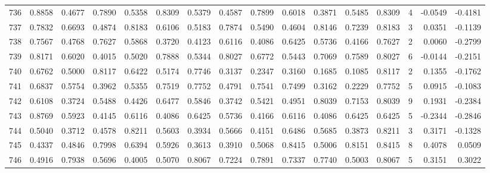 \begin{tabular}{lrrrrrrrrrrrrrrr}
736 &      0.8858 &  0.4677 &  0.7890 &  0.5358 &  0.8309 &  0.5379 &  0.4587 &  0.7899 &  0.6018 &  0.3871 &   0.5485 &     0.8309 &      4 &                   -0.0549 &                    -0.4181 \\
737 &      0.7832 &  0.6693 &  0.4874 &  0.8183 &  0.6106 &  0.5183 &  0.7874 &  0.5490 &  0.4604 &  0.8146 &   0.7239 &     0.8183 &      3 &                    0.0351 &                    -0.1139 \\
738 &      0.7567 &  0.4768 &  0.7627 &  0.5868 &  0.3720 &  0.4123 &  0.6116 &  0.4086 &  0.6425 &  0.5736 &   0.4166 &     0.7627 &      2 &                    0.0060 &                    -0.2799 \\
739 &      0.8171 &  0.6020 &  0.4015 &  0.5020 &  0.7888 &  0.5344 &  0.8027 &  0.6772 &  0.5443 &  0.7069 &   0.7589 &     0.8027 &      6 &                   -0.0144 &                    -0.2151 \\
740 &      0.6762 &  0.5000 &  0.8117 &  0.6422 &  0.5174 &  0.7746 &  0.3137 &  0.2347 &  0.3160 &  0.1685 &   0.1085 &     0.8117 &      2 &                    0.1355 &                    -0.1762 \\
741 &      0.6837 &  0.5754 &  0.3962 &  0.5355 &  0.7519 &  0.7752 &  0.4791 &  0.7541 &  0.7499 &  0.3162 &   0.2229 &     0.7752 &      5 &                    0.0915 &                    -0.1083 \\
742 &      0.6108 &  0.3724 &  0.5488 &  0.4426 &  0.6477 &  0.5846 &  0.3742 &  0.5421 &  0.4951 &  0.8039 &   0.7153 &     0.8039 &      9 &                    0.1931 &                    -0.2384 \\
743 &      0.8769 &  0.5923 &  0.4145 &  0.6116 &  0.4086 &  0.6425 &  0.5736 &  0.4166 &  0.6116 &  0.4086 &   0.6425 &     0.6425 &      5 &                   -0.2344 &                    -0.2846 \\
744 &      0.5040 &  0.3712 &  0.4578 &  0.8211 &  0.5603 &  0.3934 &  0.5666 &  0.4151 &  0.6486 &  0.5685 &   0.3873 &     0.8211 &      3 &                    0.3171 &                    -0.1328 \\
745 &      0.4337 &  0.4846 &  0.7998 &  0.6394 &  0.5926 &  0.3613 &  0.3910 &  0.5068 &  0.8415 &  0.5006 &   0.8151 &     0.8415 &      8 &                    0.4078 &                     0.0509 \\
746 &      0.4916 &  0.7938 &  0.5696 &  0.4005 &  0.5070 &  0.8067 &  0.7224 &  0.7891 &  0.7337 &  0.7740 &   0.5003 &     0.8067 &      5 &                    0.3151 &                     0.3022 \\

\end{tabular}
